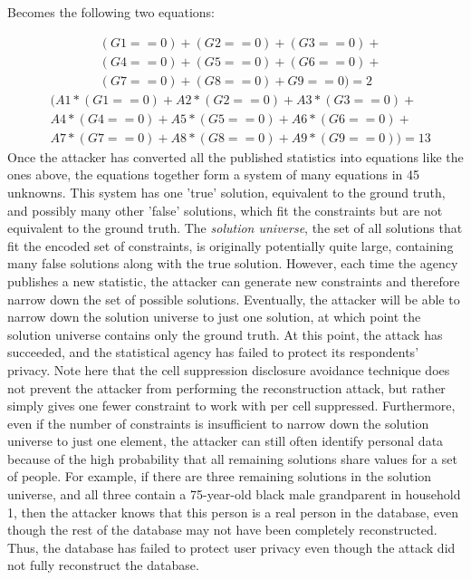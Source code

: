 \documentclass[jou,apacite]{apa6}
\begin{document}
Becomes the following two equations:

\begin{align*}
& (G1==0) + (G2==0) + (G3==0)+\\
& (G4==0)+  (G5==0) + (G6==0) +\\
& (G7==0) + (G8==0) + G9==0) = 2
\end{align*}
\begin{align*}
& (A1 * (G1==0) + A2 * (G2==0) + A3 * (G3==0) +\\
& A4 * (G4==0) +  A5 * (G5==0) + A6 * (G6==0) + \\
& A7 * (G7==0) + A8 * (G8==0) + A9 * (G9==0)) = 13
\end{align*}
Once the attacker has converted all the published statistics
into equations like the ones above, the equations together form a system of many equations in 45 unknowns. This system has one 'true' solution, equivalent to the
ground truth, and possibly many other 'false' solutions, which fit the constraints but are not equivalent to the ground truth.
The \textit{solution universe}, the set of all solutions that fit the encoded set of constraints, is originally potentially  quite large, containing many false solutions along with the true solution.
However, each time the agency publishes a new statistic, the attacker can generate new constraints and therefore narrow
down the set of possible solutions. Eventually, the attacker
will be able to narrow down the solution universe to just one solution, at which point the solution universe contains only
the ground truth. At this point, the attack has succeeded, and the statistical agency has failed to protect its respondents' privacy. Note here that the cell suppression disclosure avoidance technique does not prevent the attacker from performing the reconstruction attack, but rather simply gives one fewer constraint to work with per cell suppressed.
Furthermore, even if the number of constraints is insufficient to narrow down the solution universe to just one element, the attacker can still often identify personal data because of the high probability that all remaining solutions share values for a set of people. For example, if there are three remaining solutions in the solution universe, and all three contain a 75-year-old black male grandparent in household 1, then the attacker knows that this person is a real person in the database, even though the rest of the database may not have been completely reconstructed. Thus, the database has failed to protect user privacy even though the attack did not fully reconstruct the database.
\end{document}
